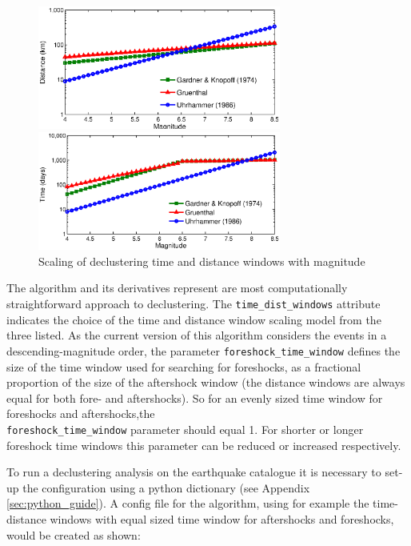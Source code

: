 \begin{figure}[htb]
  \centering
  \begin{subcaption}
      \centering
      \includegraphics[width=8cm]{./figures/declustering_distance_windows.eps}
	\end{subcaption}
  \begin{subcaption}
      \centering
      \includegraphics[width=8cm]{./figures/declustering_time_windows.eps}
	\end{subcaption}	
	\caption{Scaling of declustering time and distance windows with magnitude}
	\label{fig:declust_scaling}
\end{figure}

The \cite{GardnerKnopoff1974} algorithm and its derivatives represent 
are most computationally straightforward approach to declustering. The \verb=time_dist_windows= attribute indicates the choice of the 
time and distance window scaling model from the three listed. As 
the current version of this algorithm considers the events in a 
descending-magnitude order, the parameter \verb=foreshock_time_window= 
defines the size of the time window used for searching for foreshocks, 
as a fractional proportion of the size of the aftershock window (the 
distance windows are always equal for both fore- and aftershocks). 
So for an evenly sized time window for foreshocks and aftershocks,the\\
\verb=foreshock_time_window= parameter should equal 1. For shorter or longer 
foreshock time windows this parameter can be reduced or increased respectively.

To run a declustering analysis on the earthquake catalogue it is necessary to set-up the configuration using a python dictionary (see Appendix \ref{sec:python_guide}). A config file for the \cite{GardnerKnopoff1974} algorithm, using for example the \cite{Uhrhammer1986} time-distance windows with equal sized time window for aftershocks and foreshocks, would be created as shown:


